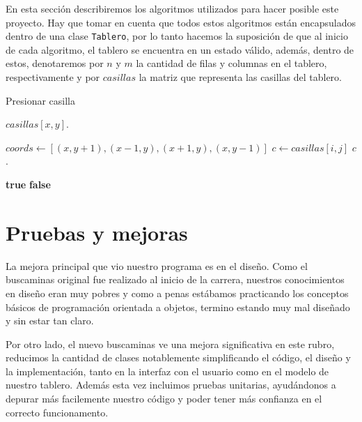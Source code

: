 \documentclass{article}
\begin{document}
	En esta sección describiremos los algoritmos utilizados para hacer posible
	este proyecto. Hay que tomar en cuenta que todos estos algoritmos están
	encapsulados dentro de una clase \texttt{Tablero}, por lo tanto hacemos la
	suposición de que al inicio de cada algoritmo, el tablero se encuentra en un
	estado válido, además, dentro de estos, denotaremos por $n$ y $m$ la
	cantidad de filas y columnas en el tablero, respectivamente y por $casillas$
	la matriz que representa las casillas del tablero.


	\begin{algorithm}
	\caption{Presionar casilla} \label{alg:presionar}
	\begin{algorithmic}[1]

	\Require {}
	\State $casillas[x,y]$.
	\State {}
	\EndProcedure

	\State \Return
	\EndIf
	\State $coords \gets [ (x,y+1), (x-1,y), (x+1,y), (x,y-1) ]$
	\State $c \gets casillas[i,j]$
	\State $c$.
	\State {}
	\EndIf
	\EndIf
	\EndFor
	\EndProcedure

	\State \Return \textbf{true}
	\EndIf
	\State \Return \textbf{false}
	\EndProcedure
	\end{algorithmic}
	\end{algorithm}


    \section{Pruebas y mejoras}    

	La mejora principal que vio nuestro programa es en el diseño. Como el
	buscaminas original fue realizado al inicio de la carrera, nuestros
	conocimientos en diseño eran muy pobres y como a penas estábamos practicando
	los conceptos básicos de programación orientada a objetos, termino estando
	muy mal diseñado y sin estar tan claro.

	Por otro lado, el nuevo buscaminas ve una mejora significativa en este
	rubro, reducimos la cantidad de clases notablemente simplificando el código,
	el diseño y la implementación, tanto en la interfaz con el usuario como en
	el modelo de nuestro tablero. Además esta vez incluimos pruebas unitarias,
	ayudándonos a depurar más facilemente nuestro código y poder tener más
	confianza en el correcto funcionamento.
\end{document}
